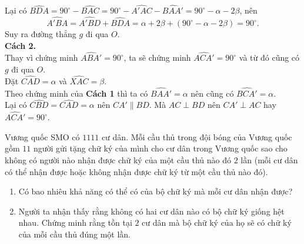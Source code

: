 \begin{ex}
{		Lại có $\widehat{BDA}=90^\circ-\widehat{BAC}=90^\circ-\widehat{A'AC}-\widehat{BAA'}=90^\circ-\alpha-2\beta$, nên $$\widehat{A'BA}=\widehat{A'BD}+\widehat{BDA}=\alpha+2\beta+\left(90^\circ-\alpha-2\beta\right)=90^\circ.$$
		Suy ra đường thẳng $g$ đi qua $O$.\\
		\textbf{Cách 2.}\\
		Thay vì chứng minh $\widehat{ABA'}=90^\circ$, ta sẽ chứng minh $\widehat{ACA'}=90^\circ$ và từ đó cũng có $g$ đi qua $O$.\\
		Đặt $\widehat{CAD}=\alpha$ và $\widehat{XAC}=\beta$.\\
		Theo chứng minh của \textbf{Cách 1} thì ta có $\widehat{BAA'}=\alpha$ nên cũng có $\widehat{BCA'}=\alpha$.\\
		Lại có $\widehat{CBD}=\widehat{CAD}=\alpha$ nên $CA'\parallel BD$. Mà $AC\perp BD$ nên $CA'\perp AC$ hay $\widehat{ACA'}=90^\circ$.
	}
\end{ex}

\begin{ex}%
	Vương quốc SMO có $1111$ cư dân. Mỗi cầu thủ trong đội bóng của Vương quốc gồm $11$ người gửi tặng chữ ký của mình cho cư dân trong Vương quốc sao cho không có người nào nhận được chữ ký của một cầu thủ nào đó $2$ lần (mỗi cư dân có thể nhận được hoặc không nhận được chữ ký từ một cầu thủ nào đó).
	\begin{enumerate}
		\item Có bao nhiêu khả năng có thể có của bộ chữ ký mà mỗi cư dân nhận được?
		\item Người ta nhận thấy rằng không có hai cư dân nào có bộ chữ ký giống hệt nhau. Chứng minh rằng tồn tại $2$ cư dân mà bộ chữ ký của họ sẽ có chữ ký của mỗi cầu thủ đúng một lần.
	\end{enumerate}
\end{ex}

